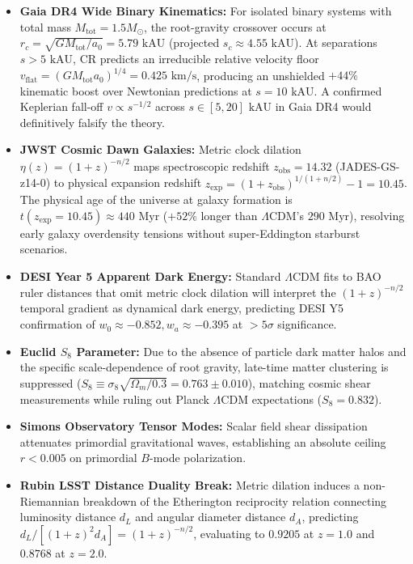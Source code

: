 \documentclass[aps,prd,reprint,superscriptaddress,nofootinbib,floatfix,amsmath,amssymb]{revtex4-2}
\begin{document}
\begin{itemize}
    \item \textbf{Gaia DR4 Wide Binary Kinematics:} For isolated binary systems with total mass $M_{\text{tot}} = 1.5 M_\odot$, the root-gravity crossover occurs at $r_c = \sqrt{G M_{\text{tot}} / a_0} = 5.79\text{ kAU}$ (projected $s_c \approx 4.55\text{ kAU}$). At separations $s > 5\text{ kAU}$, CR predicts an irreducible relative velocity floor $v_{\text{flat}} = (G M_{\text{tot}} a_0)^{1/4} = 0.425\text{ km/s}$, producing an unshielded $+44\%$ kinematic boost over Newtonian predictions at $s = 10\text{ kAU}$. A confirmed Keplerian fall-off $v \propto s^{-1/2}$ across $s \in [5, 20]\text{ kAU}$ in Gaia DR4 would definitively falsify the theory.
    \item \textbf{JWST Cosmic Dawn Galaxies:} Metric clock dilation $\eta(z) = (1+z)^{-n/2}$ maps spectroscopic redshift $z_{\text{obs}} = 14.32$ (JADES-GS-z14-0) to physical expansion redshift $z_{\text{exp}} = (1+z_{\text{obs}})^{1/(1+n/2)} - 1 = 10.45$. The physical age of the universe at galaxy formation is $t(z_{\text{exp}} = 10.45) \approx 440\text{ Myr}$ ($+52\%$ longer than $\Lambda$CDM's $290\text{ Myr}$), resolving early galaxy overdensity tensions without super-Eddington starburst scenarios.
    \item \textbf{DESI Year 5 Apparent Dark Energy:} Standard $\Lambda$CDM fits to BAO ruler distances that omit metric clock dilation will interpret the $(1+z)^{-n/2}$ temporal gradient as dynamical dark energy, predicting DESI Y5 confirmation of $w_0 \approx -0.852, w_a \approx -0.395$ at $>5\sigma$ significance.
    \item \textbf{Euclid $S_8$ Parameter:} Due to the absence of particle dark matter halos and the specific scale-dependence of root gravity, late-time matter clustering is suppressed ($S_8 \equiv \sigma_8 \sqrt{\Omega_m / 0.3} = 0.763 \pm 0.010$), matching cosmic shear measurements while ruling out Planck $\Lambda$CDM expectations ($S_8 = 0.832$).
    \item \textbf{Simons Observatory Tensor Modes:} Scalar field shear dissipation attenuates primordial gravitational waves, establishing an absolute ceiling $r < 0.005$ on primordial $B$-mode polarization.
    \item \textbf{Rubin LSST Distance Duality Break:} Metric dilation induces a non-Riemannian breakdown of the Etherington reciprocity relation connecting luminosity distance $d_L$ and angular diameter distance $d_A$, predicting $d_L / [(1+z)^2 d_A] = (1+z)^{-n/2}$, evaluating to $0.9205$ at $z = 1.0$ and $0.8768$ at $z = 2.0$.
\end{itemize}
\end{document}
